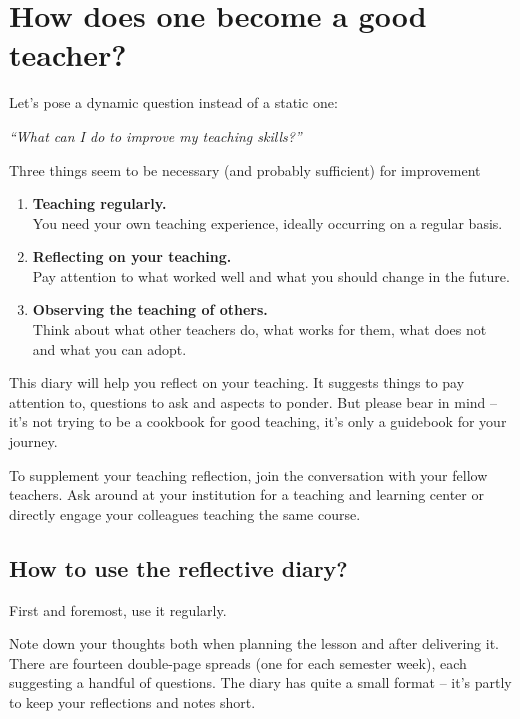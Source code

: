 
\chapter*{How does one become a good teacher?}

\vspace*{1em}
Let's pose a dynamic question instead of a static one:

\vspace*{1em}
\textit{\large \enquote{What can I do to improve my teaching skills?}}

\vspace*{1em}
Three things seem to be necessary (and probably sufficient) for improvement\footnotemark
{}
\begin{enumerate}
\item \textbf{Teaching regularly.}\\You need your own teaching experience, ideally occurring on a regular basis.
\item \textbf{Reflecting on your teaching.}\\Pay attention to what worked well and what you should change in the future.
\item \textbf{Observing the teaching of others.}\\Think about what other teachers do, what works for them, what does not and what you can adopt.
\end{enumerate}

This diary will help you reflect on your teaching. It suggests things to pay attention to, questions to ask and aspects to ponder. But please bear in mind -- it's not trying to be a cookbook for good teaching, it's only a guidebook for your journey.

To supplement your teaching reflection, join the conversation with your fellow teachers. Ask around at your institution for a teaching and learning center or directly engage your colleagues teaching the same course.

\newpage
\section*{How to use the reflective diary?}

First and foremost, use it regularly.

Note down your thoughts both when planning the lesson and after delivering it. There are fourteen double-page spreads (one for each semester week), each suggesting a handful of questions. The diary has quite a small format -- it's partly to keep your reflections and notes short.

